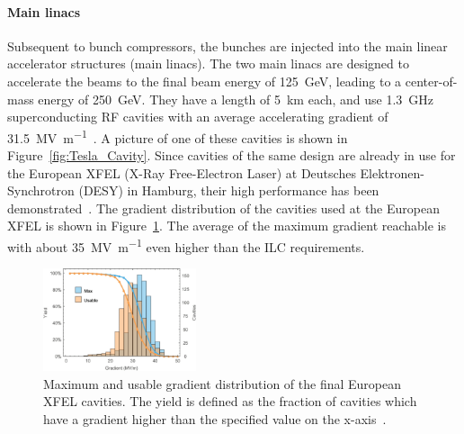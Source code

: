 \paragraph{Main linacs}
Subsequent to bunch compressors, the bunches are injected into the main linear accelerator structures (main linacs).
The two main linacs are designed to accelerate the beams to the final beam energy of \SI{125}{\GeV}, leading to a center-of-mass energy of \SI{250}{\GeV}.
They have a length of \SI{5}{\kilo\meter} each, and use \SI{1.3}{\giga\hertz} superconducting RF cavities with an average accelerating gradient of \SI{31.5}{\mega\volt\per\meter}~\cite{Walker}.
A picture of one of these cavities is shown in Figure~\ref{fig:Tesla_Cavity}. 
Since cavities of the same design are already in use for the European XFEL (X-Ray Free-Electron Laser) at Deutsches Elektronen-Synchrotron (DESY) in Hamburg, their high performance has been demonstrated~\cite{XFEL}.
The gradient distribution of the cavities used at the European XFEL is shown in Figure~\ref{fig:XFEL_cav}.
The average of the maximum gradient reachable is with about \SI{35}{\mega\volt\per\meter} even higher than the ILC requirements.
\begin{figure}[h]
\centering
\includegraphics[width=0.4\textwidth]{Figures/Cavity_Gradient.png}
\caption[XFEL cavity gradient]{Maximum and usable gradient distribution of the final European XFEL cavities.
The yield is defined as the fraction of cavities which have a gradient higher than the specified value on the x-axis~\cite[p. 18]{XFEL_Cavities}.}
\label{fig:XFEL_cav}
\end{figure}

